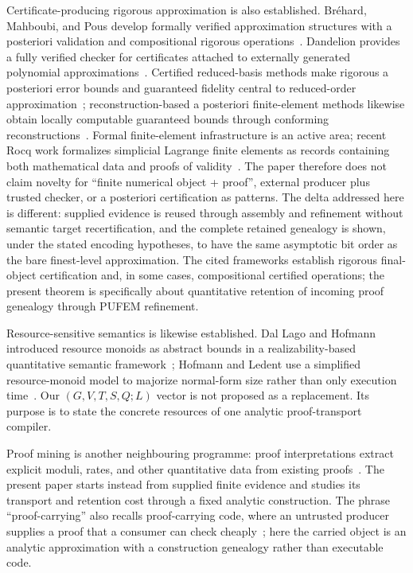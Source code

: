 \documentclass[11pt]{article}
\theoremstyle{definition}
\begin{document}
Certificate-producing rigorous approximation is also established.  Br\'ehard, Mahboubi, and Pous
develop formally verified approximation structures with a posteriori validation and compositional
rigorous operations~\cite{BrehardMahboubiPous}.  Dandelion provides a fully verified checker for
certificates attached to externally generated polynomial approximations~\cite{Dandelion}.  Certified
reduced-basis methods make rigorous a posteriori error bounds and guaranteed fidelity central to
reduced-order approximation~\cite{HesthavenRozzaStamm}; reconstruction-based a posteriori
finite-element methods likewise obtain locally computable guaranteed bounds through conforming
reconstructions~\cite{ErnStephansenVohralik}.  Formal finite-element infrastructure is an active area;
recent Rocq work formalizes simplicial Lagrange finite elements as records containing both mathematical
data and proofs of validity~\cite{BoldoEtAl2026}.  The paper therefore does not claim novelty for ``finite numerical object + proof'',
external producer plus trusted checker, or a posteriori certification as patterns.  The delta addressed here is different: supplied evidence is reused through assembly and
refinement without semantic target recertification, and the complete retained genealogy is
shown, under the stated encoding hypotheses, to have the same asymptotic bit order as the
bare finest-level approximation.  The cited frameworks establish rigorous final-object
certification and, in some cases, compositional certified operations; the present theorem
is specifically about quantitative retention of incoming proof genealogy through PUFEM
refinement.

Resource-sensitive semantics is likewise established.  Dal Lago and Hofmann introduced resource
monoids as abstract bounds in a realizability-based quantitative semantic framework~\cite{DalLagoHofmann};
Hofmann and Ledent use a simplified resource-monoid model to majorize normal-form size rather than
only execution time~\cite{HofmannLedent}.  Our $(G,V,T,S,Q;L)$ vector is not proposed as a replacement.
Its purpose is to state the concrete resources of one analytic proof-transport compiler.

Proof mining is another neighbouring programme: proof interpretations extract explicit
moduli, rates, and other quantitative data from existing proofs~\cite{Kohlenbach}.  The
present paper starts instead from supplied finite evidence and studies its transport and
retention cost through a fixed analytic construction.  The phrase ``proof-carrying'' also
recalls proof-carrying code, where an untrusted producer supplies a proof that a consumer
can check cheaply~\cite{NeculaPCC}; here the carried object is an analytic approximation
with a construction genealogy rather than executable code.
\end{document}
